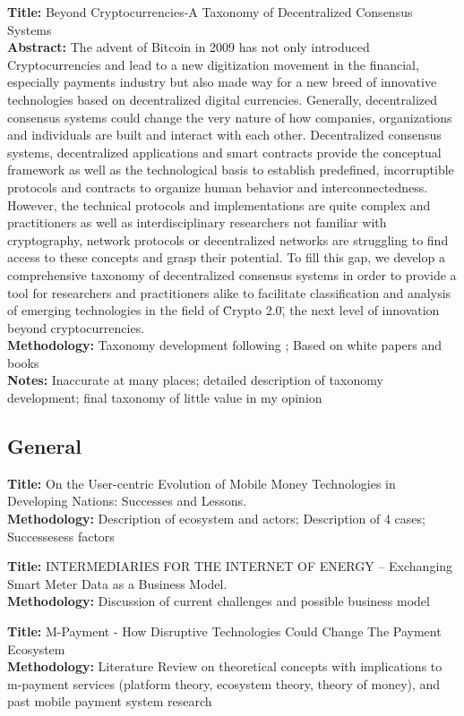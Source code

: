 \documentclass[a4paper, 12pt]{scrartcl}
\begin{document}
\textbf{Title:} Beyond Cryptocurrencies-A Taxonomy of Decentralized Consensus Systems \parencite{glaser2015beyond} \\
\textbf{Abstract:} The advent of Bitcoin in 2009 has not only introduced Cryptocurrencies and lead to a new digitization movement in the financial, especially payments industry but also made way for a new breed of innovative technologies based on decentralized digital currencies. Generally, decentralized consensus systems could change the very nature of how companies, organizations and individuals are built and interact with each other. Decentralized consensus systems, decentralized applications and smart contracts provide the conceptual framework as well as the technological basis to establish predefined, incorruptible protocols and contracts to organize human behavior and interconnectedness. However, the technical protocols and implementations are quite complex and practitioners as well as interdisciplinary researchers not familiar with cryptography, network protocols or decentralized networks are struggling to find access to these concepts and grasp their potential. To fill this gap, we develop a comprehensive taxonomy of decentralized consensus systems in order to provide a tool for researchers and practitioners alike to facilitate classification and analysis of emerging technologies in the field of \"Crypto 2.0\", the next level of innovation beyond cryptocurrencies. \\
\textbf{Methodology:} Taxonomy development following \cite{nickerson2013method}; Based on white papers and books \\
\textbf{Notes:} Inaccurate at many places; detailed description of taxonomy development; final taxonomy of little value in my opinion

\subsection{General}

\textbf{Title:} On the User-centric Evolution of Mobile Money Technologies in Developing Nations: Successes and Lessons. \parencite{dibia2014evolution} \\
\textbf{Methodology:} Description of ecosystem and actors; Description of  4 cases; Successesess factors

\textbf{Title:} INTERMEDIARIES FOR THE INTERNET OF ENERGY – Exchanging Smart Meter Data as a Business Model. \parencite{struker2011intermediaries} \\
\textbf{Methodology:} Discussion of current challenges and possible business model

\textbf{Title:} M-Payment - How Disruptive Technologies Could Change The Payment Ecosystem \parencite{dahlberg2015m} \\
\textbf{Methodology:} Literature Review on theoretical concepts with implications to m-payment services (platform theory, ecosystem theory, theory of money), and past mobile payment system research

\printbibliography
\end{document}
